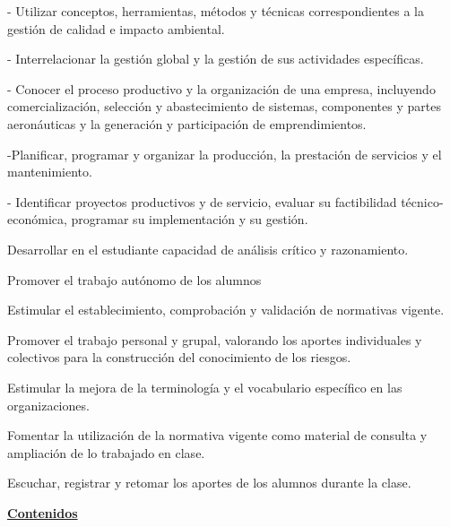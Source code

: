 \vspace{8pt}
\hspace*{3pt}- Utilizar conceptos, herramientas, métodos y técnicas correspondientes a la gestión de calidad e
impacto ambiental.

\vspace{8pt}
- Interrelacionar la gestión global y la gestión de sus actividades específicas.

\vspace{8pt}
- Conocer el proceso productivo y la organización de una empresa, incluyendo comercialización,
selección y abastecimiento de sistemas, componentes y partes aeronáuticas y la generación y
participación de emprendimientos.

\vspace{8pt}
-Planificar, programar y organizar la producción, la prestación de servicios y el mantenimiento.

\vspace{8pt}
- Identificar proyectos productivos y de servicio, evaluar su factibilidad técnico-económica,
programar su implementación y su gestión.

\newpage
\vspace*{12pt}

\begin{guiones}
  \item Desarrollar en el estudiante capacidad de análisis crítico y razonamiento.
  \item Promover el trabajo autónomo de los alumnos
  \item Estimular el establecimiento, comprobación y validación de normativas vigente.
  \item Promover el trabajo personal y grupal, valorando los aportes individuales y colectivos
        para la construcción del conocimiento de los riesgos.
  \item Estimular la mejora de la terminología y el vocabulario específico en las organizaciones.
  \item Fomentar la utilización de la normativa vigente como material de consulta y ampliación
        de lo trabajado en clase.
  \item Escuchar, registrar y retomar los aportes de los alumnos durante la clase.
\end{guiones}

\vspace{30pt}
{\fontsize{14}{17}\selectfont\underline{\textbf{Contenidos}}\par}

